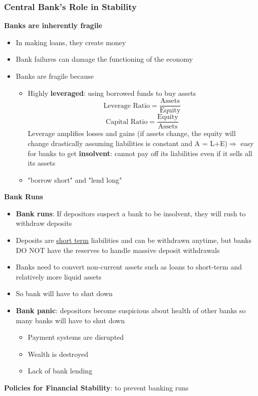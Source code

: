 \documentclass{article}
\begin{document}
\begin{multicols}{2}
\subsubsection{Central Bank's Role in Stability}
\textbf{Banks are inherently fragile}
\begin{itemize}
	\item In making loans, they create money
	\item Bank failures can damage the functioning of the economy
	\item Banks are fragile because
	\begin{itemize}
		\item Highly \textbf{leveraged}: using borrowed funds to buy assets
		$$\text{Leverage Ratio} = \frac{\text{Assets}}{\text{Equity}}$$
		$$\text{Capital Ratio} = \frac{\text{Equity}}{\text{Assets}}$$
		Leverage amplifies losses and gains (if assets change, the equity will change drastically assuming liabilities is constant and A = L+E)$\Rightarrow$ easy for banks to get \textbf{insolvent}: cannot pay off its liabilities even if it sells all its assets
		\item "borrow short" and "lend long"
	\end{itemize}
\end{itemize}
\textbf{Bank Runs}
\begin{itemize}
	\item \textbf{Bank runs}: If depositors suspect a bank to be insolvent, they will rush to withdraw deposits
	\item Deposits are \underline{short term} liabilities and can be withdrawn anytime, but banks DO NOT have the reserves to handle massive deposit withdrawals
	\item Banks need to convert non-current assets such as loans to short-term and relatively more liquid assets
	\item So bank will have to shut down
	\item \textbf{Bank panic}: depositors become suspicious about health of other banks so many banks will have to shut down
	\begin{itemize}
		\item Payment systems are disrupted
		\item Wealth is destroyed
		\item Lack of bank lending
	\end{itemize}
\end{itemize}
\textbf{Policies for Financial Stability}: to prevent banking runs
\begin{itemize}

\end{itemize}
\end{multicols}
\end{document}
